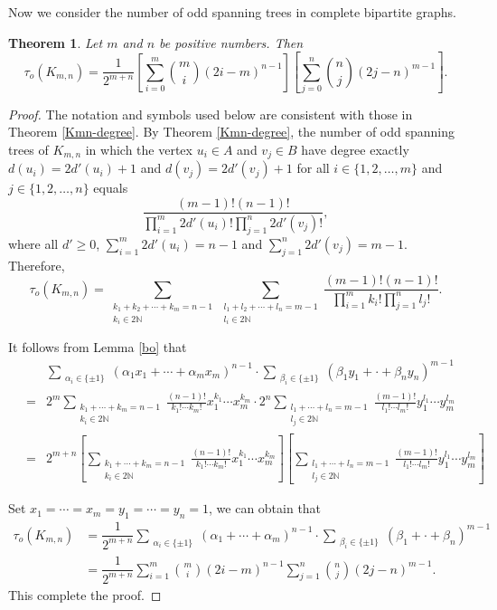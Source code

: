 \documentclass[10pt,a4paper]{article}
\newtheorem{theorem}{Theorem}[section]
\newtheorem{false statement}{False statement}
\theoremstyle{definition}
\begin{document}
Now we consider the number of odd spanning trees in complete bipartite graphs. 

\begin{theorem}\label{Kmn}
Let $m$ and $n$ be positive numbers. Then
$$\tau_o(K_{m,n})=\frac{1}{2^{m+n}}\left[\sum_{i=0}^{m}\binom{m}{i}(2i-m)^{n-1}\right]\left[\sum_{j=0}^{n}\binom{n}{j}(2j-n)^{m-1}\right].$$	
\end{theorem}

\begin{proof}
	The notation and symbols used below are consistent with those in Theorem \ref{Kmn-degree}. 
By Theorem \ref{Kmn-degree}, the number of odd spanning trees of $K_{m,n}$ 
in which the vertex $u_i\in A$ and $v_j\in B$ have degree exactly $d(u_i)=2d'(u_i)+1$ and $d(v_j)=2d'(v_j)+1$ 
for all $i\in\{1,2,\dots,m\}$ and $j\in\{1,2,\dots,n\}$ equals
$$
	\frac{(m-1)!(n-1)!}{\prod_{i=1}^{m}2d'(u_i)!\prod_{j=1}^{n}2d'(v_j)!},
	$$
	where all $d'\geq0$, $\sum_{i=1}^{m}2d'(u_i)=n-1$ and $\sum_{j=1}^{n}2d'(v_j)=m-1$. 
Therefore, 
$$\tau_o(K_{m,n})=\sum_{\substack{k_1+k_2+\cdots+k_m=n-1\\k_i\in 2\mathbb{N} }}
                  \sum_{\substack{l_1+l_2+\cdots+l_n=m-1\\l_i\in 2\mathbb{N} }}\frac{(m-1)!(n-1)!}{\prod_{i=1}^{m}k_i!\prod_{j=1}^{n}l_j!}.$$

It follows from Lemma \ref{bo} that
\begin{eqnarray*}
\ &  & \sum_{\substack{\alpha_i \in \{\pm1\}}}(\alpha_1x_1+\cdots+\alpha_mx_m)^{n-1}
        \cdot\sum_{\substack{\beta_i \in \{\pm1\}}}(\beta_1y_1+\cdot+\beta_ny_n)^{m-1} \\
& = & 2^m\sum_{\substack{k_1+\cdots+k_m=n-1\\k_i\in 2\mathbb{N}}}\frac{(n-1)!}{k_1!\cdots k_m!}x_1^{k_1}\cdots x_m^{k_m}
      \cdot2^n\sum_{\substack{l_1+\cdots+l_n=m-1\\l_j\in 2\mathbb{N}}}\frac{(m-1)!}{l_1!\cdots l_m!}y_1^{l_1}\cdots y_m^{l_m} \\
& = & 2^{m+n}\left[\sum_{\substack{k_1+\cdots+k_m=n-1\\k_i\in 2\mathbb{N}}}\frac{(n-1)!}{k_1!\cdots k_m!}x_1^{k_1}\cdots x_m^{k_m}\right]
      \left[\sum_{\substack{l_1+\cdots+l_n=m-1\\l_j\in 2\mathbb{N}}}\frac{(m-1)!}{l_1!\cdots l_m!}y_1^{l_1}\cdots y_m^{l_m}\right]
\end{eqnarray*}

Set $x_1=\cdots=x_m=y_1=\cdots=y_n=1$, we can obtain that
	\begin{align*}
		\tau_o(K_{m,n})&=\dfrac{1}{2^{m+n}}\sum_{\substack{\alpha_i \in \{\pm1\}}}(\alpha_1+\cdots+\alpha_m)^{n-1}\cdot\sum_{\substack{\beta_i \in \{\pm1\}}}(\beta_1+\cdot+\beta_n)^{m-1}\\
		&=\dfrac{1}{2^{m+n}}\sum_{i=1}^{m}\binom{m}{i}(2i-m)^{n-1}\sum_{j=1}^{n}\binom{n}{j}(2j-n)^{m-1}.
	\end{align*}
	This complete the proof.
\end{proof}
\end{document}
